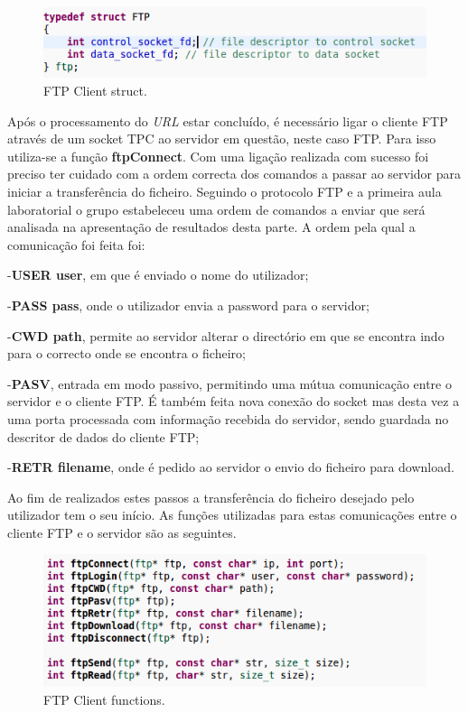 \documentclass[a4paper]{article}
\begin{document}
\begin{figure}[h!]
\includegraphics[scale=0.5]{res/ftp-struct.png}
\caption{FTP Client struct.}
\end{figure}

Após o processamento do \textit{URL} estar concluído, é necessário ligar o cliente FTP através de um socket TPC ao servidor em questão, neste caso FTP. Para isso utiliza-se a função \textbf{ftpConnect}. Com uma ligação realizada com sucesso foi preciso ter cuidado com a ordem correcta dos comandos a passar ao servidor para iniciar a transferência do ficheiro. Seguindo o protocolo FTP e a primeira aula laboratorial o grupo estabeleceu uma ordem de comandos a enviar que será analisada na apresentação de resultados desta parte. A ordem pela qual a comunicação foi feita foi:

 -\textbf{USER user}, em que é enviado o nome do utilizador;
 
 -\textbf{PASS pass}, onde o utilizador envia a password para o servidor;
 
 -\textbf{CWD path}, permite ao servidor alterar o directório em que se encontra indo para o correcto onde se encontra o ficheiro;
 
 -\textbf{PASV}, entrada em modo passivo, permitindo uma mútua comunicação entre o servidor e o cliente FTP. É também feita nova conexão do socket mas desta vez a uma porta processada com informação recebida do servidor, sendo guardada no descritor de dados do cliente FTP;
 
 -\textbf{RETR filename}, onde é pedido ao servidor o envio do ficheiro para download.
 
Ao fim de realizados estes passos a transferência do ficheiro desejado pelo utilizador tem o seu início. As funções utilizadas para estas comunicações entre o cliente FTP e o servidor são as seguintes.

\begin{figure}[h!]
\centering
\includegraphics[scale=0.5]{res/ftp-functions.png}
\caption{FTP Client functions.}
\end{figure}
\end{document}
